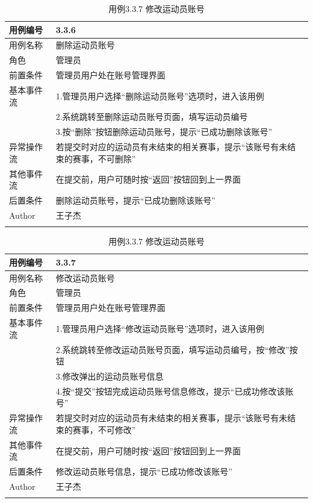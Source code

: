 \documentclass[a4paper,UTF8]{article}
\begin{document}
\begin{table}[H]
	\begin{center}
		\caption{用例3.3.6 删除运动员账号}
		\label{table:Tab_uc336}
		\begin{tabular}{|p{}|p{}|}
			\hline\noalign{\smallskip}
			用例编号 & 3.3.6\\
			\hline
			用例名称 &  删除运动员账号\\
			\hline
			角色 & 管理员\\
			\hline
			前置条件 & 管理员用户处在账号管理界面 \\
			\hline
			基本事件流 & 1.管理员用户选择“删除运动员账号”选项时，进入该用例 \\& 2.系统跳转至删除运动员账号页面，填写运动员编号 \\& 3.按“删除”按钮删除运动员账号，提示“已成功删除该账号” \\
			\hline
			异常操作流 & 若提交时对应的运动员有未结束的相关赛事，提示“该账号有未结束的赛事，不可删除” \\
			\hline
			其他事件流 & 在提交前，用户可随时按“返回”按钮回到上一界面 \\
			\hline
			后置条件 & 删除运动员账号，提示“已成功删除该账号” \\
			\hline
			Author & 王子杰 \\
			\noalign{\smallskip}
			\hline
			\noalign{\smallskip}
		\end{tabular}
		\caption{用例3.3.7 修改运动员账号}
		\label{table:Tab_uc337}
		\begin{tabular}{|p{}|p{}|}
			\hline\noalign{\smallskip}
			用例编号 & 3.3.7\\
			\hline
			用例名称 &  修改运动员账号\\
			\hline
			角色 & 管理员\\
			\hline
			前置条件 & 管理员用户处在账号管理界面 \\
			\hline
			基本事件流 & 1.管理员用户选择“修改运动员账号”选项时，进入该用例 \\& 2.系统跳转至修改运动员账号页面，填写运动员编号，按“修改”按钮 \\& 3.修改弹出的运动员账号信息 \\& 4.按“提交”按钮完成运动员账号信息修改，提示“已成功修改该账号” \\
			\hline
			异常操作流 & 若提交时对应的运动员有未结束的相关赛事，提示“该账号有未结束的赛事，不可修改” \\
			\hline
			其他事件流 & 在提交前，用户可随时按“返回”按钮回到上一界面 \\
			\hline
			后置条件 & 修改运动员账号信息，提示“已成功修改该账号” \\
			\hline
			Author & 王子杰 \\
			\noalign{\smallskip}
			\hline
			\noalign{\smallskip}
		\end{tabular}
	\end{center}
\end{table}
\end{document}
